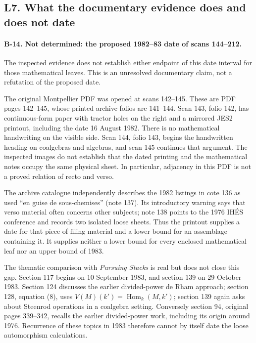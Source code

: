 \subsection{L7. What the documentary evidence does and does not date}

\paragraph{B-14. Not determined: the proposed 1982--83 date of scans
144--212.}
The inspected evidence does not establish either endpoint of this
date interval for those mathematical leaves. This is an unresolved
documentary claim, not a refutation of the proposed date.

The original Montpellier PDF was opened at scans 142--145. These
are PDF pages 142--145, whose printed archive folios are 141--144.
Scan 143, folio 142, has continuous-form paper with tractor holes
on the right and a mirrored JES2 printout, including the date
16 August 1982. There is no mathematical handwriting on the visible
side. Scan 144, folio 143, begins the handwritten heading on
coalgebras and algebras, and scan 145 continues that argument.
The inspected images do not establish that the dated printing and
the mathematical notes occupy the same physical sheet. In particular,
adjacency in this PDF is not a proved relation of recto and verso.

The archive catalogue independently describes the 1982 listings in
cote 136 as used ``en guise de sous-chemises'' (note 137). Its
introductory warning says that verso material often concerns other
subjects; note 138 points to the 1976 IH\'ES conference and records
two isolated loose sheets. Thus the printout supplies a date for
that piece of filing material and a lower bound for an assemblage
containing it. It supplies neither a lower bound for every enclosed
mathematical leaf nor an upper bound of 1983.

The thematic comparison with \emph{Pursuing Stacks} is real but does
not close this gap. Section 117 begins on 10 September 1983, and
section 139 on 29 October 1983. Section 124 discusses the earlier
divided-power de Rham approach; section 128, equation (8), uses
$V(M)(k')=\operatorname{Hom}_k(M,k')$; section 139 again asks about
Steenrod operations in a coalgebra setting. Conversely section 94,
original pages 339--342, recalls the earlier divided-power work,
including its origin around 1976. Recurrence of these topics in 1983
therefore cannot by itself date the loose automorphism calculations.

